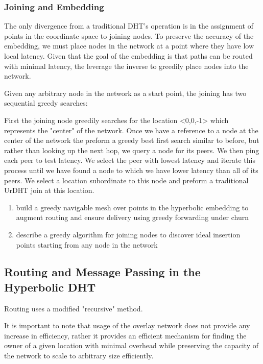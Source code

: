 \subsubsection{Joining and Embedding}

The only divergence from a traditional DHT's operation is in the assignment of points in the coordinate space to joining nodes.
To preserve the accuracy of the embedding, we must place nodes in the network at a point where they have low local latency.
Given that the goal of the embedding is that paths can be routed with minimal latency, the leverage the inverse to greedily place nodes into the network.

Given any arbitrary node in the network as a start point, the joining has two sequential greedy searches:

First the joining node greedily searches for the location <0,0,-1> which represents the "center" of the network.
Once we have a reference to a node at the center of the network the preform a greedy best first search similar to before, but rather than looking up the next hop, we query a node for its peers. We then ping each peer to test latency. We select the peer with lowest latency and iterate this process until we have found a node to which we have lower latency than all of its peers. We select a location subordinate to this node and preform a traditional UrDHT join at this location.


\begin{enumerate}
	\item build a greedy navigable mesh over points in the hyperbolic embedding to augment routing and ensure delivery using greedy forwarding under churn
	\item describe a greedy algorithm for joining nodes to discover ideal insertion points starting from any node in the network
\end{enumerate}

\subsection{Routing and Message Passing in the Hyperbolic DHT}
Routing uses a modified "recursive" method.

It is important to note that usage of the overlay network does not provide any increase in efficiency, rather it provides an efficient mechanism for finding the owner of a given location with minimal overhead while preserving the capacity of the network to scale to arbitrary size efficiently. 

